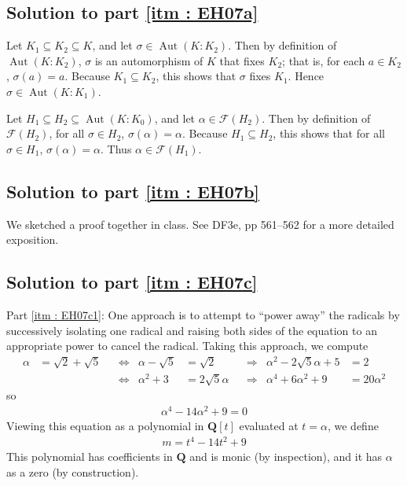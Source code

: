 \documentclass[oneside, english, 11pt]{article}
\newcommand{\fontField}[1]{\mathbf{#1}}
\newcommand{\Aut}{\automorphisms}
\DeclareMathOperator{\automorphisms}{Aut}
\newcommand{\fixedField}{\mathcal{F}}
\newcommand{\Q}{\rationals}
\newcommand{\rationals}{\fontField{Q}}
\begin{document}
\subsection*{Solution to part \ref{itm : EH07a}}

Let $K_{1} \subseteq K_{2} \subseteq K$, and let $\sigma \in \Aut(K : K_{2})$. Then by definition of $\Aut(K : K_{2})$, $\sigma$ is an automorphism of $K$ that fixes $K_{2}$; that is, for each $a \in K_{2}$, $\sigma(a) = a$. Because $K_{1} \subseteq K_{2}$, this shows that $\sigma$ fixes $K_{1}$. Hence $\sigma \in \Aut(K : K_{1})$.

Let $H_{1} \subseteq H_{2} \subseteq \Aut(K : K_{0})$, and let $\alpha \in \fixedField(H_{2})$. Then by definition of $\fixedField(H_{2})$, for all $\sigma \in H_{2}$, $\sigma(\alpha) = \alpha$. Because $H_{1} \subseteq H_{2}$, this shows that for all $\sigma \in H_{1}$, $\sigma(\alpha) = \alpha$. Thus $\alpha \in \fixedField(H_{1})$.



\subsection*{Solution to part \ref{itm : EH07b}}

We sketched a proof together in class. See DF3e, pp 561--562 for a more detailed exposition.



\subsection*{Solution to part \ref{itm : EH07c}}

Part \ref{itm : EH07c1}: One approach is to attempt to ``power away'' the radicals by successively isolating one radical and raising both sides of the equation to an appropriate power to cancel the radical. Taking this approach, we compute
\begin{align*}
\alpha
&=
\sqrt{2} + \sqrt{5}
&
&\Leftrightarrow
&
\alpha - \sqrt{5}
&=
\sqrt{2}
&
&\Rightarrow
&
\alpha^{2} - 2 \sqrt{5} \alpha + 5
&=
2
\\
&
&
&\Leftrightarrow
&
\alpha^{2} + 3
&=
2 \sqrt{5} \alpha
&
&\Rightarrow
&
\alpha^{4} + 6 \alpha^{2} + 9
&=
20 \alpha^{2}
\end{align*}
so
\begin{align*}
\alpha^{4} - 14 \alpha^{2} + 9
=
0
\end{align*}
Viewing this equation as a polynomial in $\Q[t]$ evaluated at $t = \alpha$, we define
\begin{align*}
m
=
t^{4} - 14 t^{2} + 9
\end{align*}
This polynomial has coefficients in $\Q$ and is monic (by inspection), and it has $\alpha$ as a zero (by construction).
\end{document}
